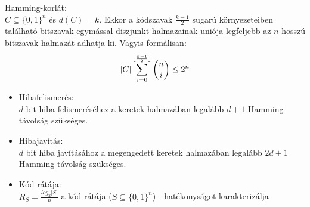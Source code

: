 \documentclass[margin=0px]{article}
\begin{document}
\begin{description}
\begin{itemize}
                  Hamming-korlát: \\
                  $ C \subseteq \{0,1\}^n$ és $d(C) = k$. Ekkor a kódszavak $\frac{k-1}{2}$ sugarú környezeteiben található bitszavak egymással diszjunkt halmazainak uniója legfeljebb az $n$-hosszú bitszavak halmazát adhatja ki. Vagyis formálisan:
                  \begin{align*}
                      |C|\sum_{i=0}^{\lfloor\frac{k-1}{2}\rfloor}\dbinom{n}{i} \leq 2^n
                  \end{align*}

                  \begin{itemize}
                      \item Hibafelismerés: \\
                            $d$ bit hiba felismeréséhez a keretek halmazában legalább $d+1$ Hamming távolság szükséges.

                      \item Hibajavítás: \\
                            $d$ bit hiba javításához a megengedett keretek halmazában legalább $2d+1$ Hamming távolság szükséges.

                      \item Kód rátája: \\
                            $R_S = \frac{log_2|S|}{n}$ a kód rátája ($S \subseteq \{0,1\}^n$) - hatékonyságot karakterizálja


\end{itemize}
\end{itemize}
\end{description}
\end{document}
